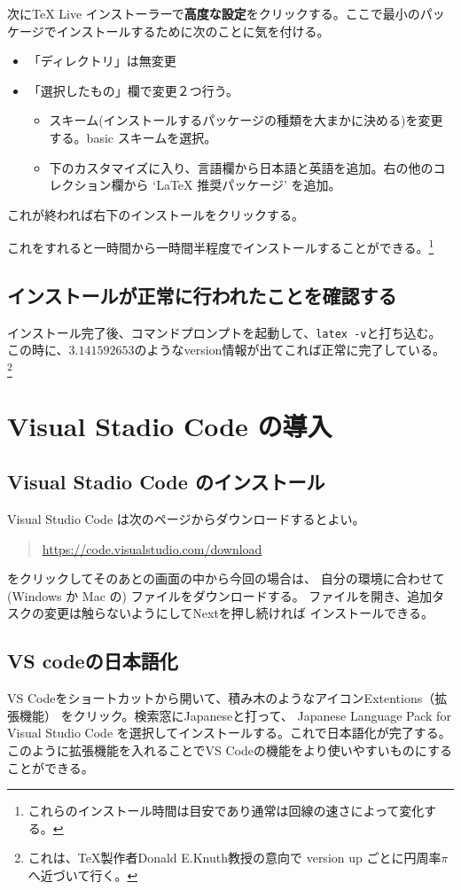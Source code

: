 \documentclass[titlepage]{ltjsarticle}
\begin{document}
次にTeX Live インストーラーで\textbf{高度な設定}をクリックする。ここで最小のパッケージでインストールするために次のことに気を付ける。
\begin{itemize}
  \item 「ディレクトリ」は無変更
  \item 「選択したもの」欄で変更２つ行う。
        \begin{itemize}
          \item スキーム(インストールするパッケージの種類を大まかに決める)を変更する。basic スキームを選択。
          \item 下のカスタマイズに入り、言語欄から日本語と英語を追加。右の他のコレクション欄から `LaTeX 推奨パッケージ' を追加。
        \end{itemize}
\end{itemize}
これが終われば右下のインストールをクリックする。

これをすれると一時間から一時間半程度でインストールすることができる。\footnote{これらのインストール時間は目安であり通常は回線の速さによって変化する。}

\subsection{インストールが正常に行われたことを確認する}
インストール完了後、コマンドプロンプトを起動して、\verb|latex -v|と打ち込む。
この時に、$3.141592653$のようなversion情報が出てこれば正常に完了している。
\footnote{
  これは、\TeX 製作者Donald E.Knuth教授の意向で
  version up ごとに円周率$\pi$へ近づいて行く。
}

\section{Visual Stadio Code の導入}
\subsection{Visual Stadio Code のインストール}
Visual Studio Code は次のページからダウンロードするとよい。
\begin{quote}
  \url{https://code.visualstudio.com/download}
\end{quote}
をクリックしてそのあとの画面の中から今回の場合は、
自分の環境に合わせて (Windows か Mac の) ファイルをダウンロードする。
ファイルを開き、追加タスクの変更は触らないようにしてNextを押し続ければ
インストールできる。
\subsection{VS codeの日本語化}
VS Codeをショートカットから開いて、積み木のようなアイコンExtentions（拡張機能）
をクリック。検索窓にJapaneseと打って、
Japanese Language Pack for Visual Studio Code
を選択してインストールする。これで日本語化が完了する。
このように拡張機能を入れることでVS Codeの機能をより使いやすいものにすることができる。
\end{document}
